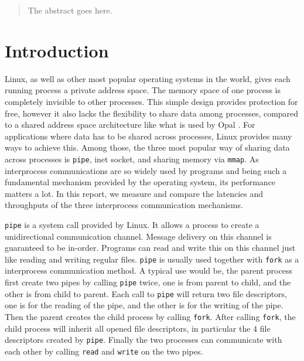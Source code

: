\documentclass[11pt,conference]{IEEEtran}
\begin{document}
\begin{abstract}
The abstract goes here.
\end{abstract}





%
\IEEEpeerreviewmaketitle

\section{Introduction}
Linux, as well as other most popular operating systems in the world, gives each running process a private address space.
The memory space of one process is completely invisible to other processes.
This simple design provides protection for free, however it also lacks the flexibility to share data among processes, compared to a shared address space architecture like what is used by Opal \cite{opal}.
For applications where data has to be shared across processes, Linux provides many ways to achieve this.
Among those, the three most popular way of sharing data across processes is \texttt{pipe}, inet socket, and sharing memory via \texttt{mmap}.
As interprocess communications are so widely used by programs and being such a fundamental mechanism provided by the operating system, its performance matters a lot.
In this report, we measure and compare the latencies and throughputs of the three interprocess communication mechanisms.

\texttt{pipe} is a system call provided by Linux.
It allows a process to create a unidirectional communication channel.
Message delivery on this channel is guaranteed to be in-order.
Programs can read and write this on this channel just like reading and writing regular files.
\texttt{pipe} is usually used together with \texttt{fork} as a interprocess communication method.
A typical use would be, the parent process first create two pipes by calling \texttt{pipe} twice, one is from parent to child, and the other is from child to parent.
Each call to \texttt{pipe} will return two file descriptors, one is for the reading of the pipe, and the other is for the writing of the pipe.
Then the parent creates the child process by calling \texttt{fork}.
After calling \texttt{fork}, the child process will inherit all opened file descriptors, in particular the $4$ file descriptors created by \texttt{pipe}.
Finally the two processes can communicate with each other by calling \texttt{read} and \texttt{write} on the two pipes.
\end{document}
